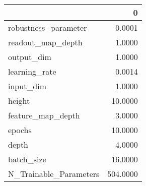 \begin{tabular}{lr}
\toprule
{} &         0 \\
\midrule
robustness\_parameter   &    0.0001 \\
readout\_map\_depth      &    1.0000 \\
output\_dim             &    1.0000 \\
learning\_rate          &    0.0014 \\
input\_dim              &    1.0000 \\
height                 &   10.0000 \\
feature\_map\_depth      &    3.0000 \\
epochs                 &   10.0000 \\
depth                  &    4.0000 \\
batch\_size             &   16.0000 \\
N\_Trainable\_Parameters &  504.0000 \\
\bottomrule
\end{tabular}
